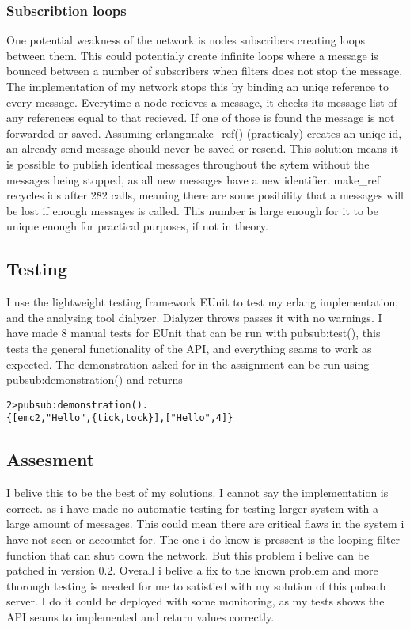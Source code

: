 \documentclass{article}
\begin{document}
\subsubsection{Subscribtion loops}

One potential weakness of the network is nodes subscribers creating
loops between them. This could potentialy create infinite loops
where a message is bounced between a number of subscribers when 
filters does not stop the message. The implementation of my
network stops this by binding an uniqe reference to every message. 
Everytime a node recieves a message, it checks its message list
of any references equal to that recieved. If one of those is found
the message is not forwarded or saved.
Assuming erlang:make\_ref() (practicaly) creates an uniqe id, an already
send message should never be saved or resend. This solution means
it is possible to publish identical messages throughout the sytem
without the messages being stopped, as all new messages have a new
identifier. make\_ref recycles ids after 2\^82 calls, meaning there
are some posibility that a messages will be lost if enough messages
is called. This number is large enough for it to be unique enough
for practical purposes, if not in theory.

\subsection{Testing}

I use the lightweight testing framework EUnit to test my erlang 
implementation, and the analysing tool dialyzer. Dialyzer throws
passes it with no warnings. I have made 8 manual tests for EUnit
that can be run with pubsub:test(), this tests the general
functionality of the API, and everything seams to work as expected.
The demonstration asked for in the assignment can be run using pubsub:demonstration()
and returns
\begin{verbatim}
2>pubsub:demonstration().
{[emc2,"Hello",{tick,tock}],["Hello",4]}
\end{verbatim}

\subsection{Assesment}

I belive this to be the best of my solutions. I cannot
say the implementation is correct.
as i have made no automatic testing for testing larger
system with a large amount of messages. This could mean
there are critical flaws in the system i have not seen
or accountet for. The one i do know is pressent is the
looping filter function that can shut down the network.
But this problem i belive can be patched in version 0.2.
Overall i belive a fix to the known problem and more thorough 
testing is needed for me to satistied with my solution of 
this pubsub server. I do it could be deployed with some
monitoring, as my tests shows the API seams to implemented
and return values correctly.
\end{document}
